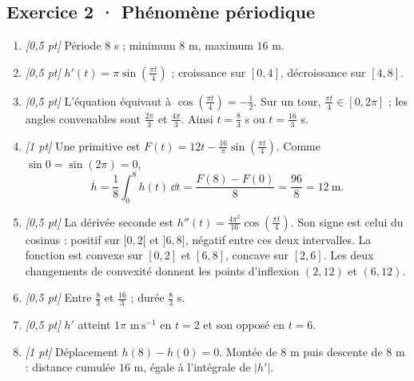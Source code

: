 \subsection*{Exercice 2 · Phénomène périodique}\begin{enumerate}

\item \textit{[0,5 pt]} Période $8$ s ; minimum $8$ m, maximum $16$ m.

\item \textit{[0,5 pt]} $h'(t)=\pi\sin (\frac{\pi t}{4})$ ; croissance sur $[0,4]$, décroissance sur $[4,8]$.

\item \textit{[0,5 pt]} L'équation équivaut à $\cos (\frac{\pi t}{4})=-\frac{1}{2}$. Sur un tour, $\frac{\pi t}{4}\in[0,2\pi]$ ; les angles convenables sont $\frac{2\pi}{3}$ et $\frac{4\pi}{3}$. Ainsi $t=\frac{8}{3}$ s ou $t=\frac{16}{3}$ s.

\item \textit{[1 pt]} Une primitive est $F(t)=12t-\frac{16}{\pi}\sin (\frac{\pi t}{4})$. Comme $\sin0=\sin(2\pi)=0$,
\[\overline h=\frac{1}{8}\int_0^{8}h(t)\,\dd t=\frac{F(8)-F(0)}{8}=\frac{96}{8}=12\ \mathrm{m}.\]

\item \textit{[0,5 pt]} La dérivée seconde est $h''(t)=\frac{4\pi^2}{16}\cos (\frac{\pi t}{4})$. Son signe est celui du cosinus : positif sur $[0,2[$ et $]6,8]$, négatif entre ces deux intervalles. La fonction est convexe sur $[0,2]$ et $[6,8]$, concave sur $[2,6]$. Les deux changements de convexité donnent les points d'inflexion $(2,12)$ et $(6,12)$.

\item \textit{[0,5 pt]} Entre $\frac{8}{3}$ et $\frac{16}{3}$ ; durée $\frac{8}{3}$ s.

\item \textit{[0,5 pt]} $h'$ atteint $1\pi$ $\mathrm{m\,s^{-1}}$ en $t=2$ et son opposé en $t=6$.

\item \textit{[1 pt]} Déplacement $h(8)-h(0)=0$. Montée de $8$ m puis descente de $8$ m : distance cumulée $16$ m, égale à l'intégrale de $|h'|$.

\end{enumerate}

